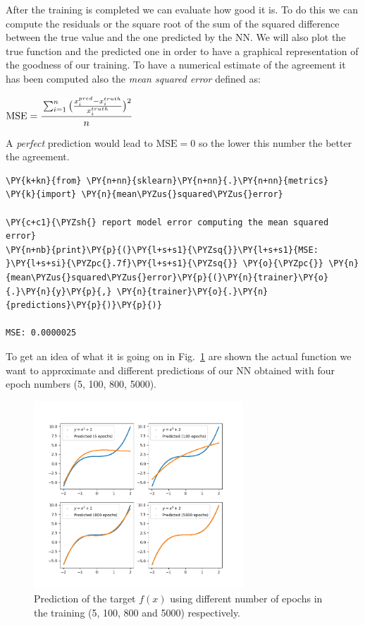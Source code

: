 After the training is completed we can evaluate how good it is. To do
this we can compute the residuals or the square root of the sum of the
squared difference between the true value and the one predicted by the
NN. We will also plot the true function and the predicted one in order
to have a graphical representation of the goodness of our training. To
have a numerical estimate of the agreement it has been computed also the
\emph{mean squared error} defined as:

\(\textrm{MSE} = \cfrac{\sum_{i=1}^n{\big(\frac{x_{i}^{pred} - x_i^{truth}}{x_i^{truth}}\big)^2}}{n}\)

A \emph{perfect} prediction would lead to \(\textrm{MSE}=0\) so the
lower this number the better the agreement.

\begin{tcolorbox}[breakable, size=fbox, boxrule=1pt, pad at break*=1mm,colback=cellbackground, colframe=cellborder]
\begin{Verbatim}[commandchars=\\\{\}]
\PY{k+kn}{from} \PY{n+nn}{sklearn}\PY{n+nn}{.}\PY{n+nn}{metrics} \PY{k}{import} \PY{n}{mean\PYZus{}squared\PYZus{}error}
	
\PY{c+c1}{\PYZsh{} report model error computing the mean squared error}
\PY{n+nb}{print}\PY{p}{(}\PY{l+s+s1}{\PYZsq{}}\PY{l+s+s1}{MSE: }\PY{l+s+si}{\PYZpc{}.7f}\PY{l+s+s1}{\PYZsq{}} \PY{o}{\PYZpc{}} \PY{n}{mean\PYZus{}squared\PYZus{}error}\PY{p}{(}\PY{n}{trainer}\PY{o}{.}\PY{n}{y}\PY{p}{,} \PY{n}{trainer}\PY{o}{.}\PY{n}{predictions}\PY{p}{)}\PY{p}{)}

MSE: 0.0000025
\end{Verbatim}
\end{tcolorbox}

To get an idea of what it is going on in Fig.~\ref{fig:training_vs_epochs} are shown the
actual function we want to approximate and different predictions of our
NN obtained with four epoch numbers (5, 100, 800, 5000).

\begin{figure}[htb]
	\centering
	\includegraphics[width=0.7\textwidth]{figures/training_vs_epoch}
	\caption{Prediction of the target $f(x)$ using different number of epochs in the training (5, 100, 800 and 5000) respectively.}
	\label{fig:training_vs_epochs}
\end{figure}

